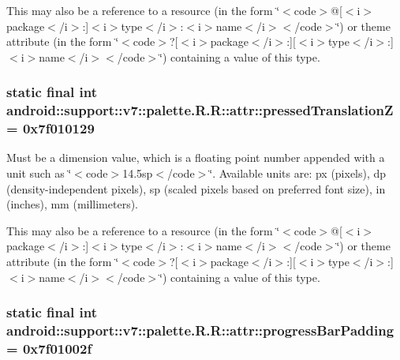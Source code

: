 This may also be a reference to a resource (in the form \char`\"{}$<$code$>$@\mbox{[}$<$i$>$package$<$/i$>$:\mbox{]}$<$i$>$type$<$/i$>$:$<$i$>$name$<$/i$>$$<$/code$>$\char`\"{}) or theme attribute (in the form \char`\"{}$<$code$>$?\mbox{[}$<$i$>$package$<$/i$>$:\mbox{]}\mbox{[}$<$i$>$type$<$/i$>$:\mbox{]}$<$i$>$name$<$/i$>$$<$/code$>$\char`\"{}) containing a value of this type. \hypertarget{classandroid_1_1support_1_1v7_1_1palette_1_1_r_1_1attr_ce71d533ea8dd22edaf6c22b74c98542}{
\subsubsection[{pressedTranslationZ}]{\setlength{\rightskip}{0pt plus 5cm}static final int android::support::v7::palette.R.R::attr::pressedTranslationZ = 0x7f010129}}
\label{classandroid_1_1support_1_1v7_1_1palette_1_1_r_1_1attr_ce71d533ea8dd22edaf6c22b74c98542}


Must be a dimension value, which is a floating point number appended with a unit such as \char`\"{}$<$code$>$14.5sp$<$/code$>$\char`\"{}. Available units are: px (pixels), dp (density-independent pixels), sp (scaled pixels based on preferred font size), in (inches), mm (millimeters). 

This may also be a reference to a resource (in the form \char`\"{}$<$code$>$@\mbox{[}$<$i$>$package$<$/i$>$:\mbox{]}$<$i$>$type$<$/i$>$:$<$i$>$name$<$/i$>$$<$/code$>$\char`\"{}) or theme attribute (in the form \char`\"{}$<$code$>$?\mbox{[}$<$i$>$package$<$/i$>$:\mbox{]}\mbox{[}$<$i$>$type$<$/i$>$:\mbox{]}$<$i$>$name$<$/i$>$$<$/code$>$\char`\"{}) containing a value of this type. \hypertarget{classandroid_1_1support_1_1v7_1_1palette_1_1_r_1_1attr_11d4567b59fc56b11f69165748dcabb2}{
\subsubsection[{progressBarPadding}]{\setlength{\rightskip}{0pt plus 5cm}static final int android::support::v7::palette.R.R::attr::progressBarPadding = 0x7f01002f}}
\label{classandroid_1_1support_1_1v7_1_1palette_1_1_r_1_1attr_11d4567b59fc56b11f69165748dcabb2}


